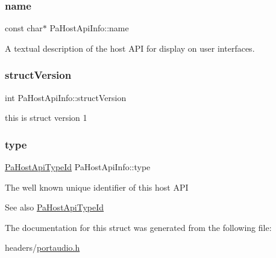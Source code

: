 \subsubsection{\texorpdfstring{name}{name}}
{\footnotesize\ttfamily const char$\ast$ Pa\+Host\+Api\+Info\+::name}

A textual description of the host A\+PI for display on user interfaces. \mbox{\label{struct_pa_host_api_info_a1f3a8c465488e7af8024237256d80c14}} 
\subsubsection{\texorpdfstring{struct\+Version}{structVersion}}
{\footnotesize\ttfamily int Pa\+Host\+Api\+Info\+::struct\+Version}

this is struct version 1 \mbox{\label{struct_pa_host_api_info_a5424bfcdf9f73b17cddc89e827a45d3f}} 
\subsubsection{\texorpdfstring{type}{type}}
{\footnotesize\ttfamily \hyperlink{portaudio_8h_a8eaebe3d39c5ea45598da8f86dc2e5ae}{Pa\+Host\+Api\+Type\+Id} Pa\+Host\+Api\+Info\+::type}

The well known unique identifier of this host A\+PI \begin{DoxySeeAlso}{See also}
\hyperlink{portaudio_8h_ae247ec252e84112170079ece319fc42c}{Pa\+Host\+Api\+Type\+Id} 
\end{DoxySeeAlso}


The documentation for this struct was generated from the following file\+:\begin{DoxyCompactItemize}
\item 
headers/\hyperlink{portaudio_8h}{portaudio.\+h}\end{DoxyCompactItemize}
